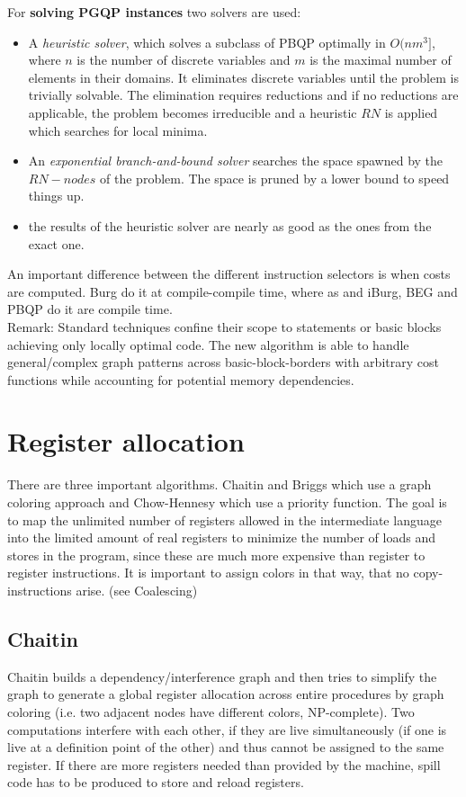 \documentclass[a4paper,10pt]{article}
\begin{document}
For \textbf{solving PGQP instances} two solvers are used:
\begin{itemize}
	\item A \textit{heuristic solver}, which solves a subclass of PBQP optimally in $O(nm^{3}]$, where $n$ is the number of discrete variables and $m$ is the maximal number of elements in their domains. It eliminates discrete variables until the problem is trivially solvable. The elimination requires reductions and if no reductions are applicable, the problem becomes irreducible and a heuristic $RN$ is applied which searches for local minima.
    \item An \textit{exponential branch-and-bound solver} searches the space spawned by the $RN-nodes$ of the problem. The space is pruned by a lower bound to speed things up.
    \item the results of the heuristic solver are nearly as good as the ones from the exact one.
\end{itemize}

An important difference between the different instruction selectors is when costs are computed. Burg do it at compile-compile time, where as and iBurg, BEG and PBQP do it are compile time.\\

Remark: Standard techniques confine their scope to statements or basic blocks achieving only locally optimal code. The new algorithm is able to handle general/complex graph patterns across basic-block-borders with arbitrary cost functions while accounting for potential memory dependencies.

\section{Register allocation}
\label{sec:register-allocation}
There are three important algorithms. Chaitin and Briggs which use a graph coloring approach and Chow-Hennesy which use a priority function. The goal is to map the unlimited number of registers allowed in the intermediate language into the limited amount of real registers to minimize the number of loads and stores in the program, since these are much more expensive than register to register instructions. It is important to assign colors in that way, that no copy-instructions arise. (see Coalescing)

\subsection{Chaitin}
Chaitin builds a dependency/interference graph and then tries to simplify the graph to generate a global register allocation across entire procedures by graph coloring (i.e. two adjacent nodes have different colors, NP-complete). Two computations interfere with each other, if they are live simultaneously (if one is live at a definition point of the other) and thus cannot be assigned to the same register. If there are more registers needed than provided by the machine, spill code has to be produced to store and reload registers.\\
\end{document}
